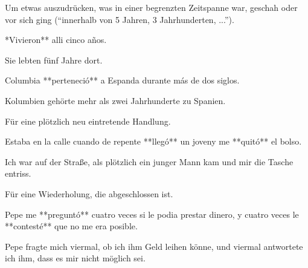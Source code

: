\begin{highlight}
Um etwas auszudrücken, was in einer begrenzten Zeitspanne
war, geschah oder vor sich ging ("`innerhalb von 5 Jahren, 3 Jahrhunderten, ..."').
\end{highlight}

\begin{compactitem}
    \item **Vivieron** alli cinco años.
    \begin{compactitem}\itshape
        \item Sie lebten fünf Jahre dort.
    \end{compactitem}
    \item Columbia **perteneció** a Espanda durante más de dos siglos.
    \begin{compactitem}\itshape
        \item Kolumbien gehörte mehr als zwei Jahrhunderte zu Spanien.
    \end{compactitem}
\end{compactitem}


\begin{highlight}
Für eine plötzlich neu eintretende Handlung.
\end{highlight}

\begin{compactitem}
    \item Estaba en la calle cuando de repente **llegó** un joveny me **quitó** el bolso.
    \begin{compactitem}\itshape
        \item Ich war auf der Straße, als plötzlich ein junger Mann kam und mir die
              Tasche entriss.
    \end{compactitem}
\end{compactitem}


\begin{highlight}
Für eine Wiederholung, die abgeschlossen ist.
\end{highlight}

\begin{compactitem}
    \item Pepe me **preguntó** cuatro veces si le podia prestar dinero, y cuatro veces
          le **contesté** que no me era posible.
    \begin{compactitem}\itshape
        \item Pepe fragte mich viermal, ob ich ihm Geld leihen könne, und viermal
              antwortete ich ihm, dass es mir nicht möglich sei.
    \end{compactitem}
\end{compactitem}


